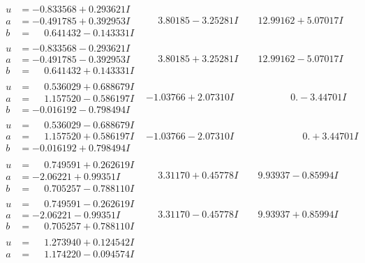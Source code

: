\documentclass[1p]{elsarticle_modified}
\theoremstyle{definition}
\begin{document}
$$\begin{array}{c|c|c}
\begin{aligned}
u &= -0.833568 + 0.293621 I \\
a &= -0.491785 + 0.392953 I \\
b &= \phantom{-}0.641432 - 0.143331 I\end{aligned}
 & \phantom{-}3.80185 - 3.25281 I & \phantom{-}12.99162 + 5.07017 I \\ \hline\begin{aligned}
u &= -0.833568 - 0.293621 I \\
a &= -0.491785 - 0.392953 I \\
b &= \phantom{-}0.641432 + 0.143331 I\end{aligned}
 & \phantom{-}3.80185 + 3.25281 I & \phantom{-}12.99162 - 5.07017 I \\ \hline\begin{aligned}
u &= \phantom{-}0.536029 + 0.688679 I \\
a &= \phantom{-}1.157520 - 0.586197 I \\
b &= -0.016192 - 0.798494 I\end{aligned}
 & -1.03766 + 2.07310 I & \phantom{-0.000000 } 0. - 3.44701 I \\ \hline\begin{aligned}
u &= \phantom{-}0.536029 - 0.688679 I \\
a &= \phantom{-}1.157520 + 0.586197 I \\
b &= -0.016192 + 0.798494 I\end{aligned}
 & -1.03766 - 2.07310 I & \phantom{-0.000000 -}0. + 3.44701 I \\ \hline\begin{aligned}
u &= \phantom{-}0.749591 + 0.262619 I \\
a &= -2.06221 + 0.99351 I \\
b &= \phantom{-}0.705257 - 0.788110 I\end{aligned}
 & \phantom{-}3.31170 + 0.45778 I & \phantom{-}9.93937 - 0.85994 I \\ \hline\begin{aligned}
u &= \phantom{-}0.749591 - 0.262619 I \\
a &= -2.06221 - 0.99351 I \\
b &= \phantom{-}0.705257 + 0.788110 I\end{aligned}
 & \phantom{-}3.31170 - 0.45778 I & \phantom{-}9.93937 + 0.85994 I \\ \hline\begin{aligned}
u &= \phantom{-}1.273940 + 0.124542 I \\
a &= \phantom{-}1.174220 - 0.094574 I \\

\end{aligned}
\end{array}$$
\end{document}
